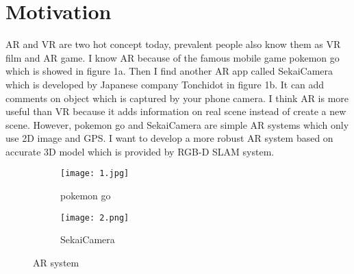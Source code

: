 \documentclass[a4paper,11pt]{article}
\begin{document}
\section{Motivation}
AR and VR are two hot concept today, prevalent people also know them as VR film and AR game. I know AR because of the famous mobile game pokemon go which is showed in figure 1a. Then I find another AR app called SekaiCamera which is developed by Japanese company Tonchidot in figure 1b. It can add comments on object which is captured by your phone camera. I think AR is more useful than VR because it adds information on real scene instead of create a new scene. However, pokemon go and SekaiCamera are simple AR systems which only use 2D image and GPS. I want to develop a more robust AR system based on accurate 3D model which is provided by RGB-D SLAM system.

\begin{figure}[!htp]
		\centering
		\begin{subfigure}{.5\textwidth}
			\centering
			\texttt{[image: 1.jpg]}
			\caption{pokemon go}
		
		\end{subfigure}%
		\begin{subfigure}{.5\textwidth}
			\centering
			\texttt{[image: 2.png]}
			\caption{SekaiCamera}
			
		\end{subfigure}
		\caption{AR system}
		\label{fig:fig1}
	\end{figure}
\end{document}

